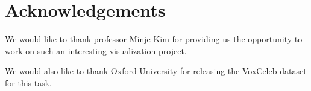 \documentclass[letterpaper]{article}
\begin{document}

    




\section{Acknowledgements}
We would like to thank professor Minje Kim for providing us the opportunity to work on such an interesting visualization project. 

We would also like to thank Oxford University for releasing the VoxCeleb dataset for this task.



\end{document}
